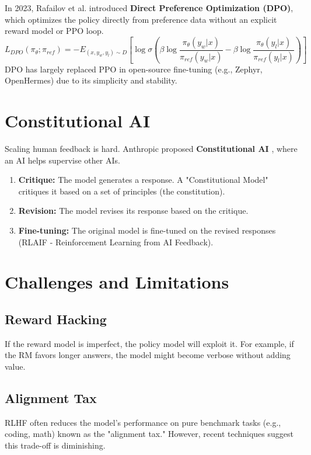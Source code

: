 In 2023, Rafailov et al. introduced \textbf{Direct Preference Optimization (DPO)}, which optimizes the policy directly from preference data without an explicit reward model or PPO loop.
\begin{equation}
    L_{DPO}(\pi_\theta; \pi_{ref}) = -E_{(x, y_w, y_l) \sim D} \left[ \log \sigma \left( \beta \log \frac{\pi_\theta(y_w|x)}{\pi_{ref}(y_w|x)} - \beta \log \frac{\pi_\theta(y_l|x)}{\pi_{ref}(y_l|x)} \right) \right]
\end{equation}
DPO has largely replaced PPO in open-source fine-tuning (e.g., Zephyr, OpenHermes) due to its simplicity and stability.

\section{Constitutional AI}

Scaling human feedback is hard. Anthropic proposed \textbf{Constitutional AI} \cite{bai2022constitutional}, where an AI helps supervise other AIs.
\begin{enumerate}
    \item \textbf{Critique:} The model generates a response. A "Constitutional Model" critiques it based on a set of principles (the constitution).
    \item \textbf{Revision:} The model revises its response based on the critique.
    \item \textbf{Fine-tuning:} The original model is fine-tuned on the revised responses (RLAIF - Reinforcement Learning from AI Feedback).
\end{enumerate}

\section{Challenges and Limitations}

\subsection{Reward Hacking}
If the reward model is imperfect, the policy model will exploit it. For example, if the RM favors longer answers, the model might become verbose without adding value.

\subsection{Alignment Tax}
RLHF often reduces the model's performance on pure benchmark tasks (e.g., coding, math) known as the "alignment tax." However, recent techniques suggest this trade-off is diminishing.

